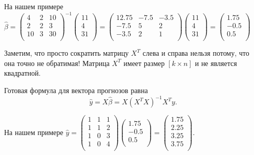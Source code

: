 \documentclass[12pt]{article}
\newcommand{\hb}{\hat{\beta}}
\newcommand{\hy}{\hat{y}}
\begin{document}
На нашем примере $\hb = \begin{pmatrix}
    4 & 2 & 10 \\
    2 & 2 & 3 \\
    10 & 3 & 30 \\
\end{pmatrix}^{-1}
\begin{pmatrix}
    11 \\
    4 \\
    31 \\
\end{pmatrix}= 
\begin{pmatrix}
    12.75 & -7.5 & -3.5 \\
    -7.5 & 5 & 2 \\
    -3.5 & 2 & 1 \\
\end{pmatrix}
\begin{pmatrix}
    11 \\
    4 \\
    31 \\
\end{pmatrix} =
\begin{pmatrix}
    1.75 \\
    -0.5\\
    0.5 \\
\end{pmatrix} 
$

Заметим, что просто сократить матрицу $X^T$ слева и справа нельзя потому, что она точно не обратимая! 
Матрица $X^T$ имеет размер $[k \times n]$ и не является квадратной.

Готовая формула для вектора прогнозов равна 
\[
\hy = X\hb = X(X^TX)^{-1} X^Ty.
\]

На нашем примере $\hy = \begin{pmatrix}
    1 & 1 & 1 \\
    1 & 1 & 2 \\
    1 & 0 & 3 \\
    1 & 0 & 4 \\
\end{pmatrix}
\begin{pmatrix}
    1.75 \\
    -0.5\\
    0.5 \\
\end{pmatrix} = 
\begin{pmatrix}
    1.75 \\
    2.25 \\
    3.25 \\
    3.75 \\
\end{pmatrix}.
$
\end{document}
